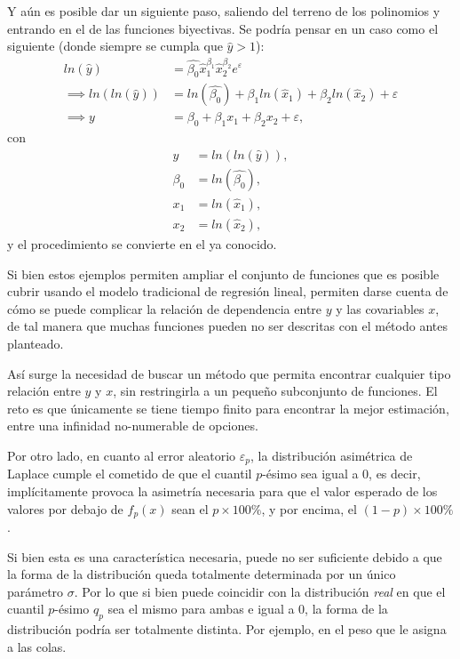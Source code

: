 Y a\'un es posible dar un siguiente paso, saliendo del terreno de los polinomios y entrando en el de las funciones biyectivas. Se podr\'ia pensar en un caso como el siguiente (donde siempre se cumpla que $\hat{y} > 1$):
\begin{equation*}
\begin{aligned}
    ln(\hat{y}) &= \hat{\beta_0}\hat{x}_1^{\beta_1}\hat{x}_2^{\beta_2} e^{\varepsilon} \\
    \implies ln(ln(\hat{y})) &= ln(\hat{\beta_0}) + \beta_1 ln(\hat{x}_1) + \beta_2 ln(\hat{x}_2) + \varepsilon \\
    \implies y &= \beta_0 + \beta_1 x_1 + \beta_2 x_2 + \varepsilon, 
\end{aligned}
\end{equation*}
con
\begin{equation*}
\begin{aligned}
    y &= ln(ln(\hat{y})), \\
    \beta_0 &= ln(\hat{\beta_0}), \\
    x_1 &= ln(\hat{x}_1), \\
    x_2 &= ln(\hat{x}_2),
\end{aligned}
\end{equation*}
y el procedimiento se convierte en el ya conocido.

Si bien estos ejemplos permiten ampliar el conjunto de funciones que es posible cubrir usando el modelo tradicional de regresi\'on lineal, permiten darse cuenta de c\'omo se puede complicar la relaci\'on de dependencia entre $y$ y las covariables $x$, de tal manera que muchas funciones pueden no ser descritas con el m\'etodo antes planteado.

As\'i surge la necesidad de buscar un m\'etodo que permita encontrar cualquier tipo relaci\'on entre $y$ y $x$, sin restringirla a un pequeño subconjunto de funciones. El reto es que \'unicamente se tiene tiempo finito para encontrar la mejor estimaci\'on, entre una infinidad no-numerable de opciones.

Por otro lado, en cuanto al error aleatorio $\varepsilon_p$, la distribuci\'on asim\'etrica de Laplace cumple el cometido de que el cuantil $p$-\'esimo sea igual a 0, es decir, impl\'icitamente provoca la asimetr\'ia necesaria para que el valor esperado de los valores por debajo de $f_p(x)$ sean el $p \times 100\%$, y por encima, el $(1-p) \times 100\%$.

Si bien esta es una caracter\'istica necesaria, puede no ser suficiente debido a que la forma de la distribuci\'on queda totalmente determinada por un \'unico par\'ametro $\sigma$. Por lo que si bien puede coincidir con la distribuci\'on \textit{real} en que el cuantil $p$-\'esimo $q_p$ sea el mismo para ambas e igual a $0$, la forma de la distribuci\'on podr\'ia ser totalmente distinta. Por ejemplo, en el peso que le asigna a las colas.

